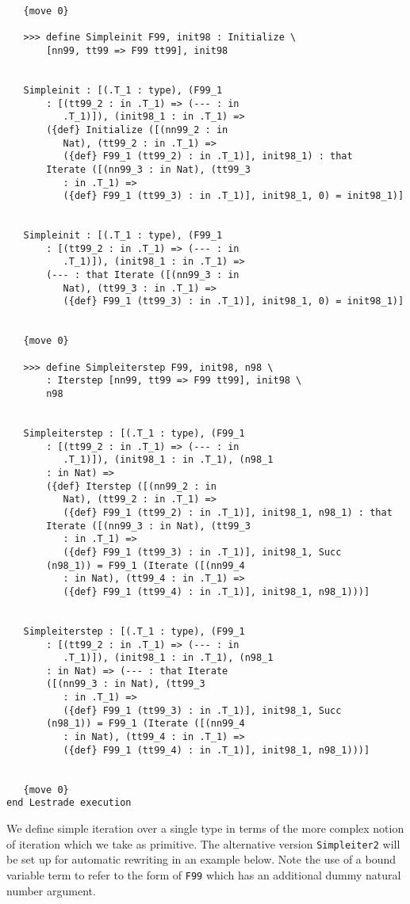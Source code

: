 \documentclass[12pt]{article}
\begin{document}
\begin{verbatim}
   {move 0}

   >>> define Simpleinit F99, init98 : Initialize \
       [nn99, tt99 => F99 tt99], init98


   Simpleinit : [(.T_1 : type), (F99_1 
       : [(tt99_2 : in .T_1) => (--- : in 
          .T_1)]), (init98_1 : in .T_1) => 
       ({def} Initialize ([(nn99_2 : in 
          Nat), (tt99_2 : in .T_1) => 
          ({def} F99_1 (tt99_2) : in .T_1)], init98_1) : that 
       Iterate ([(nn99_3 : in Nat), (tt99_3 
          : in .T_1) => 
          ({def} F99_1 (tt99_3) : in .T_1)], init98_1, 0) = init98_1)]


   Simpleinit : [(.T_1 : type), (F99_1 
       : [(tt99_2 : in .T_1) => (--- : in 
          .T_1)]), (init98_1 : in .T_1) => 
       (--- : that Iterate ([(nn99_3 : in 
          Nat), (tt99_3 : in .T_1) => 
          ({def} F99_1 (tt99_3) : in .T_1)], init98_1, 0) = init98_1)]


   {move 0}

   >>> define Simpleiterstep F99, init98, n98 \
       : Iterstep [nn99, tt99 => F99 tt99], init98 \
       n98


   Simpleiterstep : [(.T_1 : type), (F99_1 
       : [(tt99_2 : in .T_1) => (--- : in 
          .T_1)]), (init98_1 : in .T_1), (n98_1 
       : in Nat) => 
       ({def} Iterstep ([(nn99_2 : in 
          Nat), (tt99_2 : in .T_1) => 
          ({def} F99_1 (tt99_2) : in .T_1)], init98_1, n98_1) : that 
       Iterate ([(nn99_3 : in Nat), (tt99_3 
          : in .T_1) => 
          ({def} F99_1 (tt99_3) : in .T_1)], init98_1, Succ 
       (n98_1)) = F99_1 (Iterate ([(nn99_4 
          : in Nat), (tt99_4 : in .T_1) => 
          ({def} F99_1 (tt99_4) : in .T_1)], init98_1, n98_1)))]


   Simpleiterstep : [(.T_1 : type), (F99_1 
       : [(tt99_2 : in .T_1) => (--- : in 
          .T_1)]), (init98_1 : in .T_1), (n98_1 
       : in Nat) => (--- : that Iterate 
       ([(nn99_3 : in Nat), (tt99_3 
          : in .T_1) => 
          ({def} F99_1 (tt99_3) : in .T_1)], init98_1, Succ 
       (n98_1)) = F99_1 (Iterate ([(nn99_4 
          : in Nat), (tt99_4 : in .T_1) => 
          ({def} F99_1 (tt99_4) : in .T_1)], init98_1, n98_1)))]


   {move 0}
end Lestrade execution
\end{verbatim}

We define simple iteration over a single type in terms of the more complex notion of iteration which we take as primitive.  The alternative version {\tt Simpleiter2} will be set up for automatic rewriting in an example below.  Note the use of a bound variable term to refer to the form of {\tt F99} which has an additional dummy natural number argument.
\end{document}
